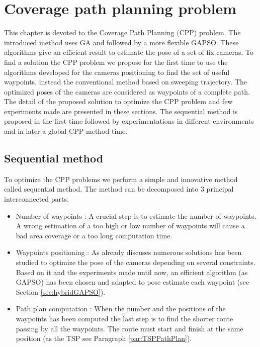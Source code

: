 \chapter{Coverage path planning problem} \label{chap:Coverage path planning problem}

\minitoc

This chapter is devoted to the Coverage Path Planning (CPP) problem. %
The introduced method uses GA and followed by a more flexible GAPSO. These algorithms give an efficient result to estimate the pose of a set of fix cameras. To find a solution the CPP problem we propose for the first time to use the algorithms developed for the cameras positioning to find the set of useful waypoints, instead the conventional method based on sweeping trajectory. The optimized poses of the cameras are considered as waypoints of a complete path. 
The detail of the proposed solution to optimize the CPP problem and few experiments made are presented in these sections. The sequential method is proposed in the first time followed by experimentations in different environments and in later a global CPP  method time.
 

\section{Sequential method} \label{sec:CPPsequantielMethod}
To optimize the CPP problems we perform a simple and innovative method called sequential method. The method can be decomposed into 3 principal interconnected parts. 
\begin{itemize}
	\item Number of waypoints : 
	A crucial step is to estimate the number of waypoints. A wrong estimation of a too high or low  number of waypoints will cause a bad area coverage or a too long computation time.
	\item Waypoints positioning : 
	As already discuses numerous solutions has been studied to optimize the pose of the cameras depending on several constraints. Based on it and the experiments made until now, an efficient algorithm (as GAPSO) has been chosen and adapted to pose estimate each waypoint (see Section  \ref{sec:hybridGAPSO}). 
	\item  Path plan computation : 
	 When the number and the positions of the waypoints has been computed the last step is to find the shorter route  passing by all the waypoints. The route must start and finish at the same position (as the TSP see Paragraph \ref{par:TSPPathPlan}).
	
\end{itemize}

